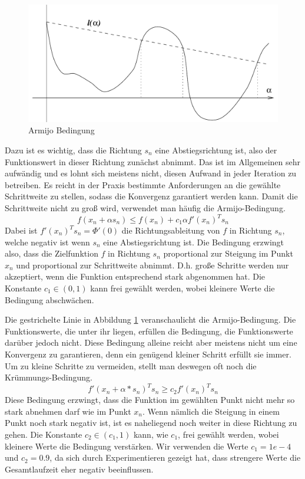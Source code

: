 \documentclass[runningheads,a4paper]{llncs}
\begin{document}
\begin{figure}[ht]
 \centering
 \includegraphics[width=\textwidth]{armijo}
 \caption{Armijo Bedingung \cite{nocedal1999numerical}}
 \label{img:armijo}
\end{figure}

Dazu ist es wichtig, dass die Richtung $s_n$ eine Abstiegsrichtung ist, also der Funktionswert in dieser Richtung zunächst abnimmt. Das ist im Allgemeinen sehr aufwändig und es lohnt sich meistens nicht, diesen Aufwand in jeder Iteration zu betreiben. Es reicht in der Praxis bestimmte Anforderungen an die gewählte Schrittweite zu stellen, sodass die Konvergenz garantiert werden kann. Damit die Schrittweite nicht zu groß wird, verwendet man häufig die Armijo-Bedingung.
\begin{equation}
\label{eq:armijo}
f(x_n+\alpha s_n) \le f(x_n)+c_1\alpha f'(x_n)^T s_n
\end{equation}
Dabei ist $f'(x_n)^T s_n = \Phi'(0)$ die Richtungsableitung von $f$ in Richtung $s_n$, welche negativ ist wenn $s_n$ eine Abstiegsrichtung ist. Die Bedingung erzwingt also, dass die Zielfunktion $f$ in Richtung $s_n$ proportional zur Steigung im Punkt $x_n$ und proportional zur Schrittweite abnimmt. D.h. große Schritte werden nur akzeptiert, wenn die Funktion entsprechend stark abgenommen hat. Die Konstante $c_1 \in (0,1)$ kann frei gewählt werden, wobei kleinere Werte die Bedingung abschwächen.

Die gestrichelte Linie in Abbildung \ref{img:armijo} veranschaulicht die Armijo-Bedingung. Die Funktionswerte, die unter ihr liegen, erfüllen die Bedingung, die Funktionswerte darüber jedoch nicht. Diese Bedingung alleine reicht aber meistens nicht um eine Konvergenz zu garantieren, denn ein genügend kleiner Schritt erfüllt sie immer. Um zu kleine Schritte zu vermeiden, stellt man deswegen oft noch die Krümmungs-Bedingung.
\begin{equation}
\label{eq:curvature}
f'(x_n+\alpha*s_n)^T s_n \ge c_2 f'(x_n)^T s_n
\end{equation}
Diese Bedingung erzwingt, dass die Funktion im gewählten Punkt nicht mehr so stark abnehmen darf wie im Punkt $x_n$. Wenn nämlich die Steigung in einem Punkt noch stark negativ ist, ist es naheliegend noch weiter in diese Richtung zu gehen. Die Konstante ${c_2\in (c_1,1)}$ kann, wie $c_1$, frei gewählt werden, wobei kleinere Werte die Bedingung verstärken. Wir verwenden die Werte $c_1 = 1e-4$ und $c_2 = 0.9$, da sich durch Experimentieren gezeigt hat, dass strengere Werte die Gesamtlaufzeit eher negativ beeinflussen.
\end{document}
